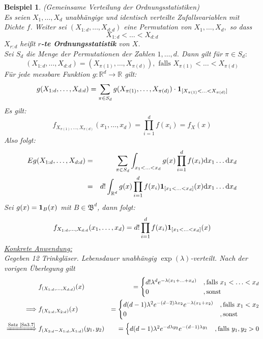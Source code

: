 \documentclass[a4paper,11pt]{scrbook}
\newcommand{\R}{{\mathbb R}}
\newcommand{\ind}{\text{\bf{1}}}
\def\BB{ \mathfrak{B} }
\def\folgt{\ensuremath{\implies}}
\newcommand{\folgtnach}[1]{\ensuremath{\DOTSB\;\xRightarrow{\text{#1}}\;}}
\def\d{\mbox{d}}
\newtheorem{Bsp}{Beispiel}[chapter]
\theoremstyle{nonumberplain}
\begin{document}
\begin{Bsp} \label{Bsp3.5} (Gemeinsame Verteilung der Ordnungsstatistiken)\\
Es seien $X_1,\ldots,X_d$ unabhängige und identisch verteilte Zufallsvariablen mit Dichte $f$. Weiter sei $(X_{1:d}, \ldots, X_{d:d})$ eine Permutation von $X_1, \ldots,X_d,$ so dass
$$X_{1:d}<\ldots<X_{d:d}$$
$X_{r:d}$ heißt \textbf{$r$-te Ordnungsstatistik}  von $X$.\\
Sei $S_d$ die Menge der Permutationen der Zahlen $1,\ldots, d.$ Dann gilt für $\pi\in S_d:$
$$(X_{1:d},\ldots,X_{d:d})=(X_{\pi(1)},\ldots, X_{\pi(d)}), \text{ falls } X_{\pi(1)}<\ldots<X_{\pi(d)}$$
Für jede messbare Funktion $g:\R^d\to\R$ gilt:
$$g(X_{1:d},\ldots,X_{d:d})=\sum_{\pi\in S_d}g(X_{\pi(1)},\ldots,X_{\pi(d)})\cdot\ind_{[X_{\pi(1)}<\ldots<X_{\pi(d)}]}$$
Es gilt:
$$f_{X_{\pi(1)},\ldots,X_{\pi(d)}}(x_1,\ldots,x_d)=\prod_{i=1}^d f(x_i) = f_X(x)$$
Also folgt:
\begin{eqnarray*}
Eg(X_{1:d},\ldots,X_{d:d})&=&\sum_{\pi\in S_d}\int_{x_1<\ldots<x_d} g(x)\prod_{i=1}^d f(x_i)\d x_1\ldots\d x_d\\
&=&d!\int_{\R^d}g(x)\prod_{i=1}^d f(x_i)\ind_{[x_1<\ldots<x_d]}(x)\d x_1\ldots\d x_d\\
\end{eqnarray*}
Sei $g(x)=\ind_B(x)$ mit $B\in\BB^d$, dann folgt:
$$f_{X_{1:d},\ldots,X_{d:d}}(x_1,\ldots,x_d)=d!\prod_{i=1}^d f(x_i)\ind_{[x_1<\ldots <x_d]}(x)$$
\underline{Konkrete Anwendung:}\\
Gegeben 12 Trinkgläser. Lebensdauer unabhängig $\exp(\lambda)$-verteilt. Nach der vorigen Überlegung gilt
\begin{eqnarray*}
&f_{(X_{1:d},\ldots,X_{d:d})}(x)&=\begin{cases}
d!\lambda^d e^{-\lambda(x_1+\ldots+x_d)} &,\text{falls } x_1<\ldots<x_d\\
0&,\text{sonst}
\end{cases}\\
\folgt&f_{(X_{1:d},X_{2:d})}(x)&=\begin{cases}
d(d-1)\lambda^2 e^{-(d-2)\lambda x_2} e^{-\lambda(x_1+x_2)} &,\text{falls } x_1<x_2\\
0&,\text{sonst}
\end{cases}\\
\folgtnach{Satz \ref{Sa3.7}}&f_{(X_{2:d}-X_{1:d},X_{1:d})}(y_1,y_2)&=\begin{cases}
d(d-1)\lambda^2 e^{-d\lambda y_2} e^{-(d-1)\lambda y_1} &,\text{falls } y_1,y_2>0\\

\end{cases}
\end{eqnarray*}
\end{Bsp}
\end{document}
